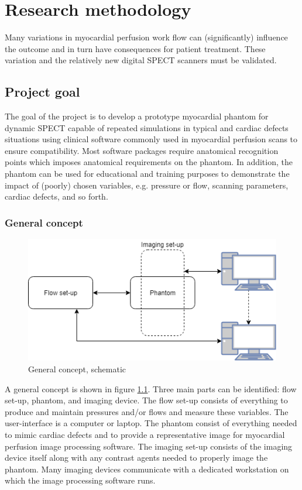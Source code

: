 \chapter{Research methodology}
\label{ch:res_metho}

Many variations in myocardial perfusion work flow can (significantly) influence the outcome and in turn have consequences for patient treatment. These variation and the relatively new digital SPECT scanners must be validated. 

\section{Project goal}
The goal of the project is to develop a prototype myocardial phantom for dynamic SPECT capable of repeated simulations in typical and cardiac defects situations using  clinical software commonly used in myocardial perfusion scans to ensure compatibility. Most software packages require anatomical recognition points which imposes anatomical requirements on the phantom. In addition, the phantom can be used for educational and training purposes to demonstrate the impact of (poorly) chosen variables, e.g. pressure or flow, scanning parameters, cardiac defects, and so forth.
\subsection{General concept}
\begin{figure}[b!]
	\begin{center}
		\includegraphics[width=0.75\linewidth]{images/global_setup.png}
	\end{center}
	\caption{General concept, schematic}
	\label{fig:general_concept}
\end{figure}
A general concept is shown in figure \ref{fig:general_concept}. Three main parts can be identified: flow set-up, phantom, and imaging device. The flow set-up consists of everything to produce and maintain pressures and/or flows and measure these variables. The user-interface is a computer or laptop. The phantom consist of everything needed to mimic cardiac defects and to provide a representative image for myocardial perfusion image processing software. The imaging set-up consists of the imaging device itself along with any contrast agents needed to properly image the phantom. Many imaging devices communicate with a dedicated workstation on which the image processing software runs.

